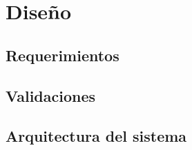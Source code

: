 \chapter{Diseño}\label{chapter:diseno}


\section{Requerimientos}



\section{Validaciones}

\section{Arquitectura del sistema}


